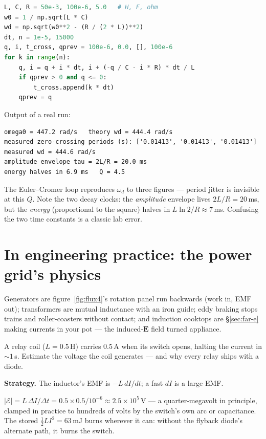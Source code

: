 \begin{lstlisting}[language=Python,caption={\texttt{code/ch14\_rlc\_ring.py} --- an underdamped RLC ring-down: measure the oscillation, audit it against theory.},label={lst:rlcring}]
L, C, R = 50e-3, 100e-6, 5.0   # H, F, ohm
w0 = 1 / np.sqrt(L * C)
wd = np.sqrt(w0**2 - (R / (2 * L))**2)
dt, n = 1e-5, 15000
q, i, t_cross, qprev = 100e-6, 0.0, [], 100e-6
for k in range(n):
    q, i = q + i * dt, i + (-q / C - i * R) * dt / L
    if qprev > 0 and q <= 0:
        t_cross.append(k * dt)
    qprev = q
\end{lstlisting}

Output of a real run:
\begin{lstlisting}[numbers=none]
omega0 = 447.2 rad/s   theory wd = 444.4 rad/s
measured zero-crossing periods (s): ['0.01413', '0.01413', '0.01413']
measured wd = 444.6 rad/s
amplitude envelope tau = 2L/R = 20.0 ms
energy halves in 6.9 ms   Q = 4.5
\end{lstlisting}

The Euler--Cromer loop reproduces $\omega_d$ to three figures ---
period jitter is invisible at this $Q$. Note the two decay clocks:
the \emph{amplitude} envelope lives $2L/R=20$\,ms, but the
\emph{energy} (proportional to the square) halves in $L\ln2/R\approx
7$\,ms. Confusing the two time constants is a classic lab error.

\section{In engineering practice: the power grid's physics}\label{sec:far-eng}

Generators are figure~\ref{fig:flux4}'s rotation panel run backwards
(work in, EMF out); transformers are mutual inductance with an iron
guide; eddy braking stops trains and roller-coasters without contact;
and induction cooktops are \S\ref{sec:far-e} making currents in your
pot --- the induced-$\mathbf E$ field turned appliance.

\begin{example}\label{ex:flyback}
A relay coil ($L=0.5$\,H) carries $0.5$\,A when its switch opens,
halting the current in $\sim1$\,\textmu s. Estimate the voltage
the coil generates --- and why every relay ships with a diode.
\par\smallskip
\textbf{Strategy.} The inductor's EMF is $-L\,dI/dt$; a fast $dI$
is a large EMF.
\begin{solution}
$|\mathcal E|=L\,\Delta I/\Delta t=0.5\times0.5/10^{-6}
\approx2.5\times10^{5}$\,V --- a quarter-megavolt in principle,
clamped in practice to hundreds of volts by the switch's own arc or
capacitance. The stored $\tfrac12LI^{2}=63$\,mJ burns wherever it
can: without the flyback diode's alternate path, it burns the switch.
\checkmark
\end{solution}
\end{example}

